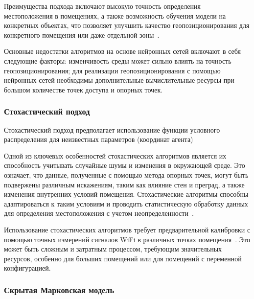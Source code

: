 Преимущества подхода включают высокую точность определения местоположения в помещениях, а также возможность обучения модели на конкретных объектах, что позволяет улучшить качество геопозиционирования для конкретного помещения или даже отдельной зоны~\cite{neural-networks}.

Основные недостатки алгоритмов на основе нейронных сетей включают в себя следующие факторы: изменчивость среды может сильно влиять на точность геопозиционирования; для реализации геопозиционирования с помощью нейронных сетей необходимы дополнительные вычислительные ресурсы при большом количестве точек доступа и опорных точек.

\subsubsection{Стохастический подход}

Стохастический подход предполагает использование функции условного распределения для неизвестных параметров (координат агента)

Одной из ключевых особенностей стохастических алгоритмов является их способность учитывать случайные шумы и изменения в окружающей среде. Это означает, что данные, полученные с помощью метода опорных точек, могут быть подвержены различным искажениям, таким как влияние стен и преград, а также изменения внутренних условий помещения. Стохастические алгоритмы способны адаптироваться к таким условиям и проводить статистическую обработку данных для определения местоположения с учетом неопределенности~\cite{trends}.

Использование стохастических алгоритмов требует предварительной калибровки с помощью точных измерений сигналов WiFi в различных точках помещения~\cite{lin2021probabilistic}. Это может быть сложным и затратным процессом, требующим значительных ресурсов, особенно для больших помещений или для помещений с переменной конфигурацией.

\subsubsection{Скрытая Марковская модель}


